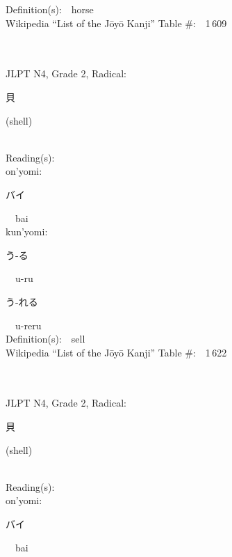 \begin{multicols}{2}
Definition(s):\ \ horse \\
Wikipedia ``List of the J\=oy\=o Kanji'' Table \#:\ \ 1\,609 \\
\ \ \\
{\fontsize{34pt}{40pt}  }\ \ \\  %
{JLPT N4, Grade 2, Radical:\ \ {\begin{CJK}{UTF8}{min} 貝 \end{CJK}} (shell) } \\
Reading(s):\ \ \\
{\hspace*{1em}}on'yomi:\ \ \\
{\hspace*{2em}}{\begin{CJK}{UTF8}{min} バイ \end{CJK}}\ \ bai\ \ \\
{\hspace*{1em}}kun'yomi:\ \ \\
{\hspace*{2em}}{\begin{CJK}{UTF8}{min} う-る \end{CJK}}\ \ u-ru\ \ \\
{\hspace*{2em}}{\begin{CJK}{UTF8}{min} う-れる \end{CJK}}\ \ u-reru\ \ \\
Definition(s):\ \ sell \\
Wikipedia ``List of the J\=oy\=o Kanji'' Table \#:\ \ 1\,622 \\
\ \ \\
{\fontsize{34pt}{40pt}  }\ \ \\  %
{JLPT N4, Grade 2, Radical:\ \ {\begin{CJK}{UTF8}{min} 貝 \end{CJK}} (shell) } \\
Reading(s):\ \ \\
{\hspace*{1em}}on'yomi:\ \ \\
{\hspace*{2em}}{\begin{CJK}{UTF8}{min} バイ \end{CJK}}\ \ bai\ \ \\

\end{multicols}
